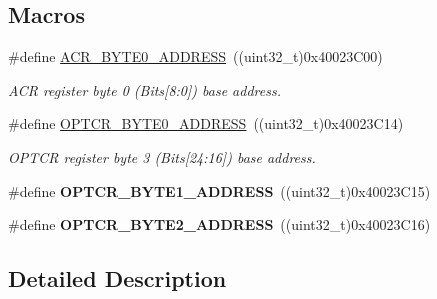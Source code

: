 \subsection*{Macros}
\begin{DoxyCompactItemize}
\item 
\hypertarget{group___f_l_a_s_h___exported___constants_gaeaca61fbcff69df08100280868bff214}{}\#define \hyperlink{group___f_l_a_s_h___exported___constants_gaeaca61fbcff69df08100280868bff214}{A\+C\+R\+\_\+\+B\+Y\+T\+E0\+\_\+\+A\+D\+D\+R\+E\+S\+S}~((uint32\+\_\+t)0x40023\+C00)\label{group___f_l_a_s_h___exported___constants_gaeaca61fbcff69df08100280868bff214}

\begin{DoxyCompactList}\small\item\em A\+C\+R register byte 0 (Bits\mbox{[}8\+:0\mbox{]}) base address. \end{DoxyCompactList}\item 
\hypertarget{group___f_l_a_s_h___exported___constants_ga8223df020203a97af44e4b14e219d01e}{}\#define \hyperlink{group___f_l_a_s_h___exported___constants_ga8223df020203a97af44e4b14e219d01e}{O\+P\+T\+C\+R\+\_\+\+B\+Y\+T\+E0\+\_\+\+A\+D\+D\+R\+E\+S\+S}~((uint32\+\_\+t)0x40023\+C14)\label{group___f_l_a_s_h___exported___constants_ga8223df020203a97af44e4b14e219d01e}

\begin{DoxyCompactList}\small\item\em O\+P\+T\+C\+R register byte 3 (Bits\mbox{[}24\+:16\mbox{]}) base address. \end{DoxyCompactList}\item 
\hypertarget{group___f_l_a_s_h___exported___constants_ga3c08568a9b3a9d213a70eff8e87117ac}{}\#define {\bfseries O\+P\+T\+C\+R\+\_\+\+B\+Y\+T\+E1\+\_\+\+A\+D\+D\+R\+E\+S\+S}~((uint32\+\_\+t)0x40023\+C15)\label{group___f_l_a_s_h___exported___constants_ga3c08568a9b3a9d213a70eff8e87117ac}

\item 
\hypertarget{group___f_l_a_s_h___exported___constants_ga600e8029b876676da246a62924a294c7}{}\#define {\bfseries O\+P\+T\+C\+R\+\_\+\+B\+Y\+T\+E2\+\_\+\+A\+D\+D\+R\+E\+S\+S}~((uint32\+\_\+t)0x40023\+C16)\label{group___f_l_a_s_h___exported___constants_ga600e8029b876676da246a62924a294c7}

\end{DoxyCompactItemize}


\subsection{Detailed Description}
